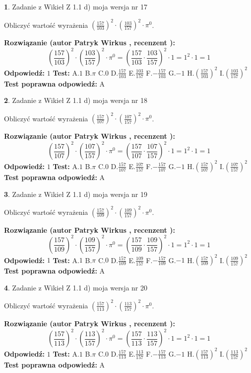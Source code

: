 \documentclass[12pt, a4paper]{article}
\theoremstyle{definition} %
\newtheorem{zad}{}
\newcommand{\zadStart}[1]{\begin{zad}#1\newline}
\newcommand{\zadStop}{\end{zad}}
\newcommand{\rozwStart}[2]{\noindent \textbf{Rozwiązanie (autor #1 , recenzent #2): }\newline}
\newcommand{\rozwStop}{\newline}
\newcommand{\odpStart}{\noindent \textbf{Odpowiedź:}\newline}
\newcommand{\odpStop}{\newline}
\newcommand{\testStart}{\noindent \textbf{Test:}\newline}
\newcommand{\testStop}{\newline}
\newcommand{\kluczStart}{\noindent \textbf{Test poprawna odpowiedź:}\newline}
\newcommand{\kluczStop}{\newline}
\begin{document}
\zadStart{Zadanie z Wikieł Z 1.1 d) moja wersja nr 17}

Obliczyć wartość wyrażenia $(\frac{157}{103})^{2} \cdot (\frac{103}{157})^{2} \cdot \pi^{0}$.
\zadStop
\rozwStart{Patryk Wirkus}{}
$$(\frac{157}{103})^{2} \cdot (\frac{103}{157})^{2} \cdot \pi^{0} = (\frac{157}{103} \cdot \frac{103}{157})^{2} \cdot 1 = 1^{2} \cdot 1 = 1$$
\rozwStop
\odpStart
$1$
\odpStop
\testStart
A.$1$ B.$\pi$ C.$0$ D.$\frac{157}{103}$ E.$\frac{103}{157}$
F.$-\frac{157}{103}$ G.$-1$
H.$(\frac{157}{103})^{2}$
I.$(\frac{103}{157})^{2}$
\testStop
\kluczStart
A
\kluczStop



\zadStart{Zadanie z Wikieł Z 1.1 d) moja wersja nr 18}

Obliczyć wartość wyrażenia $(\frac{157}{107})^{2} \cdot (\frac{107}{157})^{2} \cdot \pi^{0}$.
\zadStop
\rozwStart{Patryk Wirkus}{}
$$(\frac{157}{107})^{2} \cdot (\frac{107}{157})^{2} \cdot \pi^{0} = (\frac{157}{107} \cdot \frac{107}{157})^{2} \cdot 1 = 1^{2} \cdot 1 = 1$$
\rozwStop
\odpStart
$1$
\odpStop
\testStart
A.$1$ B.$\pi$ C.$0$ D.$\frac{157}{107}$ E.$\frac{107}{157}$
F.$-\frac{157}{107}$ G.$-1$
H.$(\frac{157}{107})^{2}$
I.$(\frac{107}{157})^{2}$
\testStop
\kluczStart
A
\kluczStop



\zadStart{Zadanie z Wikieł Z 1.1 d) moja wersja nr 19}

Obliczyć wartość wyrażenia $(\frac{157}{109})^{2} \cdot (\frac{109}{157})^{2} \cdot \pi^{0}$.
\zadStop
\rozwStart{Patryk Wirkus}{}
$$(\frac{157}{109})^{2} \cdot (\frac{109}{157})^{2} \cdot \pi^{0} = (\frac{157}{109} \cdot \frac{109}{157})^{2} \cdot 1 = 1^{2} \cdot 1 = 1$$
\rozwStop
\odpStart
$1$
\odpStop
\testStart
A.$1$ B.$\pi$ C.$0$ D.$\frac{157}{109}$ E.$\frac{109}{157}$
F.$-\frac{157}{109}$ G.$-1$
H.$(\frac{157}{109})^{2}$
I.$(\frac{109}{157})^{2}$
\testStop
\kluczStart
A
\kluczStop



\zadStart{Zadanie z Wikieł Z 1.1 d) moja wersja nr 20}

Obliczyć wartość wyrażenia $(\frac{157}{113})^{2} \cdot (\frac{113}{157})^{2} \cdot \pi^{0}$.
\zadStop
\rozwStart{Patryk Wirkus}{}
$$(\frac{157}{113})^{2} \cdot (\frac{113}{157})^{2} \cdot \pi^{0} = (\frac{157}{113} \cdot \frac{113}{157})^{2} \cdot 1 = 1^{2} \cdot 1 = 1$$
\rozwStop
\odpStart
$1$
\odpStop
\testStart
A.$1$ B.$\pi$ C.$0$ D.$\frac{157}{113}$ E.$\frac{113}{157}$
F.$-\frac{157}{113}$ G.$-1$
H.$(\frac{157}{113})^{2}$
I.$(\frac{113}{157})^{2}$
\testStop
\kluczStart
A
\kluczStop
\end{document}
